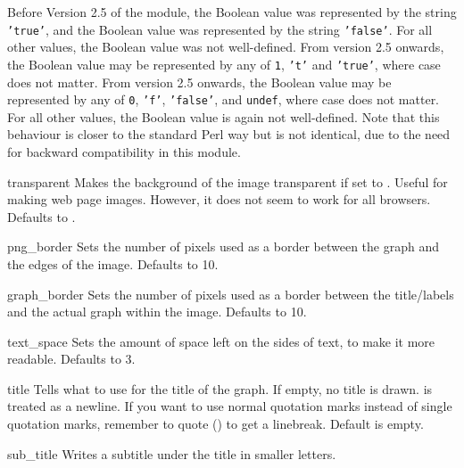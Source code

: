 Before Version 2.5 of the module, the Boolean value  was
represented by the string \texttt{'true'}, and the Boolean value
 was represented by the string \texttt{'false'}. For all
other values, the Boolean value was not well-defined.
From version 2.5 onwards, the Boolean value  may be
represented by any of \texttt{1}, \texttt{'t'} and \texttt{'true'},
where case does not matter.
From version 2.5 onwards, the Boolean value  may be
represented by any of \texttt{0}, \texttt{'f'}, \texttt{'false'}, and
\texttt{undef}, where case does not matter. For all other values, the
Boolean value is again not well-defined. Note that this behaviour is
closer to the standard Perl way but is not identical, due to the need
for backward compatibility in this module.

\begin{AttrDecl}{transparent}
Makes the background of the image transparent if set to .
Useful for making web page images. However, it does not seem to work
for all browsers. Defaults to .
\end{AttrDecl}

\begin{AttrDecl}{png\_border}
Sets the number of pixels used as a border between the graph and the
edges of the image. Defaults to 10.
\end{AttrDecl}

\begin{AttrDecl}{graph\_border}
Sets the number of pixels used as a border between the title/labels and
the actual graph within the image. Defaults to 10.
\end{AttrDecl}

\begin{AttrDecl}{text\_space}
Sets the amount of space left on the sides of text, to make it more
readable. Defaults to 3.
\end{AttrDecl}

\begin{AttrDecl}{title}
Tells \chart what to use for the title of the graph. If empty, no title
is drawn. \literal{\bs\bs} is treated as a newline. If you want to use
normal quotation marks instead of single quotation marks, remember to
quote (\literal{\bs\bs\bs\bs}) to get a linebreak. Default is empty.
\end{AttrDecl}

\begin{AttrDecl}{sub\_title}
Writes a subtitle under the title in smaller letters.
\end{AttrDecl}

